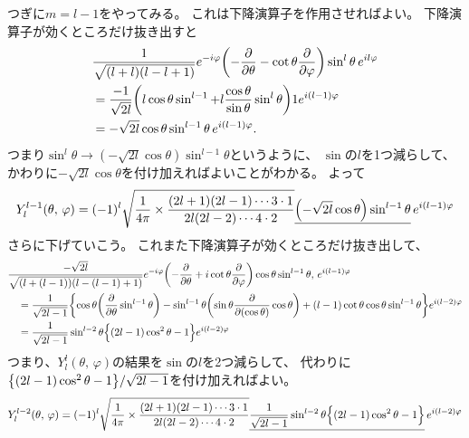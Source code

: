 \documentclass[../../master.tex]{subfiles}
\begin{document}
つぎに\(m=l-1\)をやってみる。
これは下降演算子を作用させればよい。
下降演算子が効くところだけ抜き出すと
\begin{align}
	& \frac{1}{\sqrt{(l+l)(l-l+1)}}e^{-i\varphi}\qty(-\pdv{\theta}-\cot\theta\pdv{\varphi})\sin^l\theta \, e^{il\varphi}\\
	& =\frac{-1}{\sqrt{2l}}\qty(l\cos\theta\sin^{l-1}+l\frac{\cos\theta}{\sin\theta}\sin^l\theta)1e^{i(l-1)\varphi} \\
	& =-\sqrt{2l}\cos\theta\sin^{l-1}\theta\,e^{i(l-1)\varphi}.
\end{align}
つまり\(\sin^l\theta\rightarrow(-\sqrt{2l}\cos\theta)\sin^{l-1}\theta\)というように、
\(\sin\)の\(l\)を1つ減らして、かわりに\(-\sqrt{2l}\cos\theta\)を付け加えればよいことがわかる。
よって
\begin{equation}
	Y_{l}^{l-1}(\theta,\,\varphi)=(-1)^l
	\sqrt{\frac{1}{4\pi}\times\frac{(2l+1)(2l-1)\cdots 3\cdot 1}{2l(2l-2) \cdots 4\cdot 2}}
	\underline{\qty(-\sqrt{2l}\cos\theta)\sin^{l-1}\theta} \, e^{i(l-1)\varphi}
\end{equation}
さらに下げていこう。
これまた下降演算子が効くところだけ抜き出して、
\begin{align}
	 & \frac{-\sqrt{2l}}{\sqrt{(l+(l-1))(l-(l-1)+1)}}e^{-i\varphi}\qty(-\pdv{\theta} + i\cot\theta\pdv{\varphi})\cos\theta\sin^{l-1}\theta,\,e^{i(l-1)\varphi} \notag \\
	 & \quad=\frac{1}{\sqrt{2l-1}}
	\qty{\cos\theta\qty(\pdv{\theta}\sin^{l-1}\theta)
	-\sin^{l-1}\theta\qty(\sin\theta\pdv{(\cos\theta)}\cos\theta) + (l-1)\cot\theta\cos\theta\sin^{l-1}\theta}e^{i(l-2)\varphi}                                       \\
	 & \quad=\frac{1}{\sqrt{2l-1}}\sin^{l-2}\theta\Bigr\{(2l-1)\cos^2\theta-1\Bigl\}e^{i(l-2)\varphi}
\end{align}
つまり、\(Y_l^l(\theta,\,\varphi)\)の結果を\(\sin\)の\(l\)を2つ減らして、
代わりに\(\qty{(2l-1)\cos^2\theta-1}/\sqrt{2l-1}\)を付け加えればよい。
\begin{equation}
	Y_l^{l-2}(\theta,\,\varphi)
	= (-1)^l\sqrt{\frac{1}{4\pi}\times\frac{(2l+1)(2l-1)\cdots 3\cdot 1}{2l(2l-2) \cdots 4\cdot 2}}
	\underline{\frac{1}{\sqrt{2l-1}}\sin^{l-2}\theta\Bigr\{(2l-1)\cos^2\theta-1\Bigl\}} \, e^{i(l-2)\varphi}
\end{equation}

\end{document}
